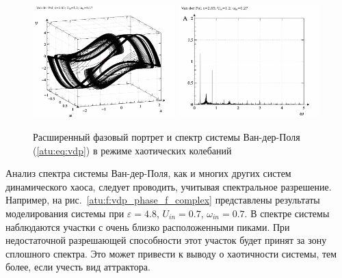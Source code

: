 \begin{figure}[ht!]
\begin{center}
  \includegraphics[width=0.49\textwidth]{p/cha/vdp/vdp_0-p_ph2d_2x65_1x20_0x27.png}
  \hfill
  \includegraphics[width=0.49\textwidth]{p/cha/vdp/vdp_fft-p_f_2x65_1x20_0x27.png}
\end{center}
  \caption{Расширенный фазовый портрет и спектр системы Ван-дер-Поля (\ref{atu:eq:vdp}) в режиме хаотических колебаний}
\label{atu:f:vdp_phase_f_chaos}
\end{figure}

Анализ спектра системы Ван-дер-Поля, как и многих других систем
динамического хаоса, следует проводить, учитывая
спектральное разрешение.
Например, на  рис.~\ref{atu:f:vdp_phase_f_complex}
представлены результаты моделирования системы при
$ \varepsilon=4.8$, $U_{in}=0.7$, $\omega_{in}=0.7$.
В спектре системы наблюдаются участки с очень близко
расположенными пиками. При недостаточной разрешающей способности
этот участок будет принят за зону сплошного спектра.
Это может привести к выводу о хаотичности системы,
тем более, если учесть вид аттрактора.

